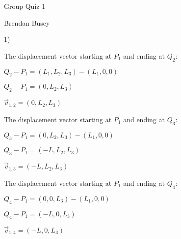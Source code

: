 \documentclass[12pt, executivepaper]{article}
\begin{document}
\vspace*{-40mm}

\begin{center}

Group Quiz 1

\end{center}

\begin{flushright}

Brendan Busey

\end{flushright}

\begin{flushleft}

1) \\ 

\vspace{3mm}

The displacement vector starting at $P_{1}$ and ending at $Q_{2}$:

\begin{center}

$Q_{2}-P_{1}=(L_{1}, L_{2}, L_{3})-(L_{1}, 0, 0)$

$Q_{2}-P_{1}=(0, L_{2}, L_{3})$

$\vec v_{1,2}=(0, L_{2}, L_{3})$

\end{center}

\vspace{5mm}

The displacement vector starting at $P_{1}$ and ending at $Q_{3}$:

\begin{center}

$Q_{3}-P_{1}=(0, L_{2}, L_{3})-(L_{1}, 0, 0)$

$Q_{3}-P_{1}=(-L, L_{2}, L_{3})$

$\vec v_{1,3}=(-L, L_{2}, L_{3})$

\end{center}

\vspace{5mm}

The displacement vector starting at $P_{1}$ and ending at $Q_{4}$:

\begin{center}

$Q_{4}-P_{1}=(0, 0, L_{3})-(L_{1}, 0, 0)$

$Q_{4}-P_{1}=(-L, 0, L_{3})$

$\vec v_{1,4}=(-L, 0, L_{3})$

\end{center}


\end{flushleft}
\end{document}
